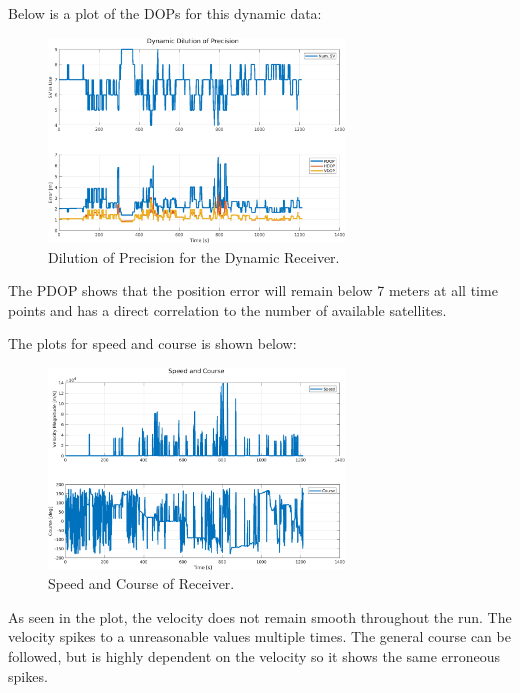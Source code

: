\documentclass[11pt]{article}
\begin{document}
\begin{enumerate}[label=\textbf{\arabic*.}]
  Below is a plot of the DOPs for this dynamic data:
  \begin{figure}[H]
    \centering
    \includegraphics[width=0.7\textwidth]{dynamic_dop.png}
    \caption{Dilution of Precision for the Dynamic Receiver.}
  \end{figure}
  The PDOP shows that the position error will remain below 7 meters at all 
  time points and has a direct correlation to the number of available satellites.

  The plots for speed and course is shown below:
  \begin{figure}[H]
    \centering
    \includegraphics[width=0.7\textwidth]{dynamic_vel_course.png}
    \caption{Speed and Course of Receiver.}
  \end{figure}
  As seen in the plot, the velocity does not remain smooth throughout the 
  run. The velocity spikes to a unreasonable values multiple times. The general 
  course can be followed, but is highly dependent on the velocity so it shows the 
  same erroneous spikes. \\


\end{enumerate}
\end{document}
